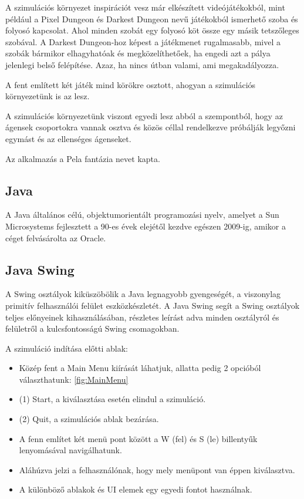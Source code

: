 

A szimulációs környezet inspirációt vesz már elkészített videójátékokból, mint például a Pixel Dungeon \cite{pixeldungeon} és Darkest Dungeon \cite{darkestdungeon} 
nevű játékokból ismerhető szoba és folyosó kapcsolat. Ahol minden szobát egy folyosó köt össze egy másik tetszőleges szobával.
A Darkest Dungeon-hoz képest a játékmenet rugalmasabb, mivel a szobák bármikor elhagyhatóak és megközelíthetőek, ha engedi azt a pálya jelenlegi belső felépítése.
Azaz, ha nincs útban valami, ami megakadályozza.

A fent említett két játék mind körökre osztott, ahogyan a szimulációs környezetünk is az lesz.

A szimulációs környezetünk viszont egyedi lesz abból a szempontból, hogy az ágensek csoportokra vannak osztva és közös céllal
rendelkezve próbálják legyőzni egymást és az ellenséges ágenseket.

Az alkalmazás a Pela fantázia nevet kapta.


\subsection{Java}

A Java általános célú, objektumorientált programozási nyelv, amelyet a Sun Microsystems fejlesztett a 90-es évek elejétől kezdve egészen 2009-ig, amikor a céget felvásárolta az Oracle.

\subsection{Java Swing}

A Swing osztályok kiküszöbölik a Java legnagyobb gyengeségét, a viszonylag primitív felhasználói felület eszközkészletét. A Java Swing segít a Swing osztályok teljes előnyeinek kihasználásában,
részletes leírást adva minden osztályról és felületről a kulcsfontosságú Swing csomagokban.


A szimuláció indítása előtti ablak:

\begin{itemize}
    \item Közép fent a Main Menu kiírását láhatjuk, allatta pedig 2 opcióból választhatunk: \ref{fig:MainMenu}
    \item (1) Start, a kiválasztása esetén elindul a szimuláció.
    \item (2) Quit, a szimulációs ablak bezárása.
    \item A fenn említet két menü pont között a W (fel) és S (le) billentyűk lenyomásával navigálhatunk.
    \item Aláhúzva jelzi a felhasználónak, hogy mely menüpont van éppen kiválasztva.
    \item A különböző ablakok és UI elemek egy egyedi fontot használnak. \cite{yosterislandfont}
\end{itemize}

